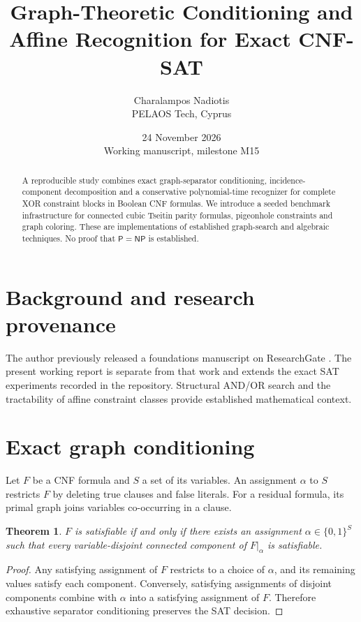 \documentclass[11pt,a4paper]{article}
\title{Graph-Theoretic Conditioning and Affine Recognition for Exact CNF-SAT}
\author{Charalampos Nadiotis\\PELAOS Tech, Cyprus}
\date{24 November 2026\\Working manuscript, milestone M15}
\newtheorem{theorem}{Theorem}
\begin{document}
\maketitle

\begin{abstract}
A reproducible study combines exact graph-separator conditioning,
incidence-component decomposition and a conservative polynomial-time
recognizer for complete XOR constraint blocks in Boolean CNF formulas.
We introduce a seeded benchmark infrastructure for connected cubic
Tseitin parity formulas, pigeonhole constraints and graph coloring.
These are implementations of established graph-search and algebraic
techniques. No proof that $\mathsf{P}=\mathsf{NP}$ is established.
\end{abstract}

\section{Background and research provenance}
The author previously released a foundations manuscript on
ResearchGate \cite{nadiotis}. The present working report is separate
from that work and extends the exact SAT experiments recorded in
the repository. Structural AND/OR search \cite{dechter} and the
tractability of affine constraint classes \cite{schaefer} provide
established mathematical context.

\section{Exact graph conditioning}
Let $F$ be a CNF formula and $S$ a set of its variables.
An assignment $\alpha$ to $S$ restricts $F$ by deleting true
clauses and false literals. For a residual formula, its primal
graph joins variables co-occurring in a clause.

\begin{theorem}
$F$ is satisfiable if and only if there exists an assignment
$\alpha\in\{0,1\}^{S}$ such that every variable-disjoint connected
component of $F|_\alpha$ is satisfiable.
\end{theorem}
\begin{proof}
Any satisfying assignment of $F$ restricts to a choice of $\alpha$,
and its remaining values satisfy each component. Conversely,
satisfying assignments of disjoint components combine with
$\alpha$ into a satisfying assignment of $F$. Therefore exhaustive
separator conditioning preserves the SAT decision.
\end{proof}
\end{document}
